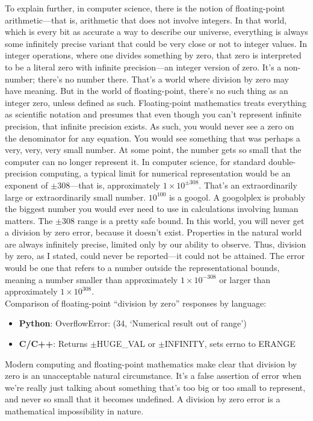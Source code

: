 \documentclass[twoside,twocolumn,9pt]{article}
\begin{document}
To explain further, in computer science, there is the notion of floating-point arithmetic---that is, arithmetic that does not involve integers. In that world, which is every bit as accurate a way to describe our universe, everything is always some infinitely precise variant that could be very close or not to integer values. In integer operations, where one divides something by zero, that zero is interpreted to be a literal zero with infinite precision---an integer version of zero. It's a non-number; there's no number there. That's a world where division by zero may have meaning. But in the world of floating-point, there's no such thing as an integer zero, unless defined as such. Floating-point mathematics treats everything as scientific notation and presumes that even though you can't represent infinite precision, that infinite precision exists. As such, you would never see a zero on the denominator for any equation. You would see something that was perhaps a very, very, very small number. At some point, the number gets so small that the computer can no longer represent it. In computer science, for standard double-precision computing, a typical limit for numerical representation would be an exponent of $\pm308$---that is, approximately $1\times10^{\pm308}$. That's an extraordinarily large or extraordinarily small number. $10^{100}$ is a googol. A googolplex is probably the biggest number you would ever need to use in calculations involving human matters. The $\pm308$ range is a pretty safe bound. In this world, you will never get a division by zero error, because it doesn't exist. Properties in the natural world are always infinitely precise, limited only by our ability to observe. Thus, division by zero, as I stated, could never be reported---it could not be attained. The error would be one that refers to a number outside the representational bounds, meaning a number smaller than approximately $1\times10^{-308}$ or larger than approximately $1\times10^{308}$.\\

\noindent Comparison of floating-point ``division by zero'' responses by language:
\begin{itemize}
    \item \textbf{Python}: OverflowError: (34, `Numerical result out of range')
    \item \textbf{C/C++}: Returns $\pm$HUGE\_VAL or $\pm$INFINITY, sets errno to ERANGE
\end{itemize}
Modern computing and floating-point mathematics make clear that division by zero is an unacceptable natural circumstance. It's a false assertion of error when we're really just talking about something that's too big or too small to represent, and never so small that it becomes undefined. A division by zero error is a mathematical impossibility in nature.\\
\end{document}
